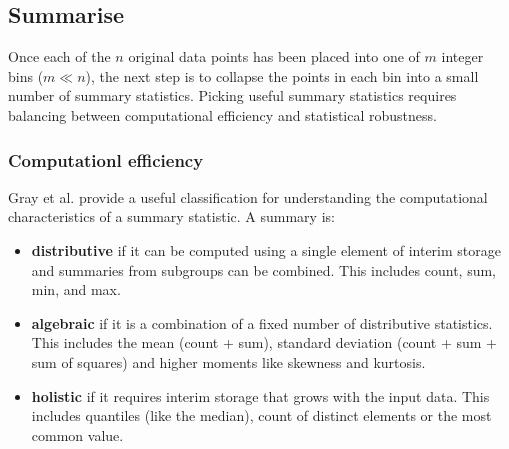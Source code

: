 \documentclass[journal]{vgtc}                %
\begin{document}


\subsection{Summarise}
\label{sub:summarise}

Once each of the $n$ original data points has been placed into one of $m$ integer bins ($m \ll n$), the next step is to collapse the points in each bin into a small number of summary statistics. Picking useful summary statistics requires balancing between computational efficiency and statistical robustness. 

\subsubsection{Computationl efficiency}

Gray et al. \citep{gray:1997} provide a useful classification for understanding the computational characteristics of a summary statistic. A summary is:

\begin{itemize}
  \item {\bf distributive} if it can be computed using a single element of interim storage and summaries from subgroups can be combined. This includes count, sum, min, and max.
  
  \item {\bf algebraic} if it is a combination of a fixed number of distributive statistics. This includes the mean (count + sum), standard deviation (count + sum + sum of squares) and higher moments like skewness and kurtosis.
  
  \item {\bf holistic} if it requires interim storage that grows with the input data. This includes quantiles (like the median), count of distinct elements or the most common value. 

\end{itemize}
\end{document}
